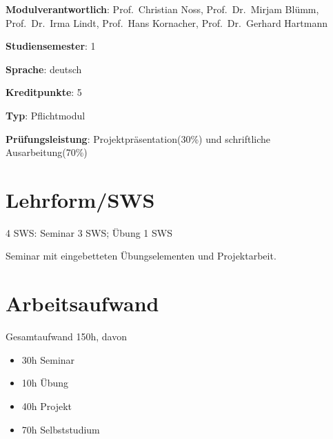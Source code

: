 \begin{modulHead}
\textbf{Modulverantwortlich}: Prof.~Christian Noss,
Prof.~Dr.~Mirjam Blümm, Prof.~Dr.~Irma Lindt, Prof.~Hans Kornacher,
Prof.~Dr.~Gerhard
Hartmann
\end{modulHead}
\begin{modulHead}
\textbf{Studiensemester}:
1
\end{modulHead}
\begin{modulHead}
\textbf{Sprache}:
deutsch
\end{modulHead}
\begin{modulHead}
\textbf{Kreditpunkte}:
5
\end{modulHead}
\begin{modulHead}
\textbf{Typ}:
Pflichtmodul
\end{modulHead}
\begin{modulHead}
\textbf{Prüfungsleistung}:
Projektpräsentation(30\%) und schriftliche
Ausarbeitung(70\%)
\end{modulHead}


\hypertarget{lehrformswspathlabelmi-2017modulbeschreibungen-bachelorba_einfhrungindiemedieninformatik}{%
\section*{Lehrform/SWS\label{/mi-2017/modulbeschreibungen-bachelor/BA_EinfhrungindieMedieninformatik}}\label{lehrformswspathlabelmi-2017modulbeschreibungen-bachelorba_einfhrungindiemedieninformatik}}

4 SWS: Seminar 3 SWS; Übung 1 SWS

Seminar mit eingebetteten Übungselementen und Projektarbeit.

\hypertarget{arbeitsaufwandpathlabelmi-2017modulbeschreibungen-bachelorba_einfhrungindiemedieninformatik}{%
\section*{Arbeitsaufwand\label{/mi-2017/modulbeschreibungen-bachelor/BA_EinfhrungindieMedieninformatik}}\label{arbeitsaufwandpathlabelmi-2017modulbeschreibungen-bachelorba_einfhrungindiemedieninformatik}}

Gesamtaufwand 150h, davon

\begin{itemize}
\tightlist
\item
  30h Seminar
\item
  10h Übung
\item
  40h Projekt
\item
  70h Selbststudium
\end{itemize}


